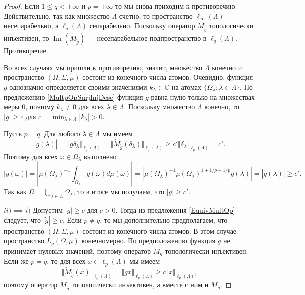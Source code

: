 \begin{proof}
Если $1\leq q<+\infty$ и $p=+\infty$ то мы снова приходим к противоречию. Действительно, так как множество $\Lambda$ счетно, то пространство $\ell_\infty(\Lambda)$ несепарабельно, а $\ell_q(\Lambda)$ сепарабельно. Поскольку оператор $\widetilde{M}_{\widetilde{g}}$ топологически инъективен, то $\operatorname{Im}(\widetilde{M}_{\widetilde{g}})$ --- несепарабельное подпространство в $\ell_q(\Lambda)$. Противоречие.

Во всех случаях мы пришли к противоречию, значит, множество $\Lambda$ конечно и пространство $(\Omega,\Sigma,\mu)$ состоит из конечного числа атомов. Очевидно, функция
$g$ однозначно определяется своими значениями $k_\lambda\in\mathbb{C}$ на атомах $\{\Omega_\lambda:\lambda\in\Lambda\}$. По предложению \ref{MultpOpSurjInjDesc} функция $g$ равна нулю только на множествах меры $0$, поэтому $k_\lambda\neq 0$ для всех $\lambda\in\Lambda$. Поскольку множество $\Lambda$ конечно, то $|g|\geq c$ для $c=\min_{\lambda\in\Lambda}|k_\lambda|>0$. 

Пусть $p=q$. Для любого $\lambda\in\Lambda$ мы имеем
$$
|\widetilde{g}(\lambda)|
=\Vert \widetilde{g} \delta_\lambda\Vert_{\ell_q(\Lambda)}
=\Vert \widetilde{M}_{\widetilde{g}}(\delta_\lambda)\Vert_{\ell_q(\Lambda)}
\geq c'\Vert \delta_\lambda\Vert_{\ell_p(\Lambda)}
=c'.
$$
Поэтому для всех $\omega\in\Omega_\lambda$ выполнено
$$
|g(\omega)|
=\left|\mu(\Omega_\lambda)^{-1}\int_{\Omega_\lambda}g(\omega)d\mu(\omega)\right|
=\left|\mu(\Omega_\lambda)^{-1}\mu(\Omega_\lambda)^{1+1/p-1/p}\widetilde{g}(\lambda)\right|
=|\widetilde{g}(\lambda)|\geq c'.
$$
Так как $\Omega=\bigcup_{\lambda\in\Lambda}\Omega_\lambda$, то в итоге мы получаем, что $|g|\geq c'$.

$ii)$$\implies$$ i)$ Допустим $|g|\geq c$ для $c>0$. Тогда из предложения \ref{EquivMultOp} следует, что $|\widetilde{g}|\geq c$. Если $p\neq q$, то мы дополнительно предполагаем, что пространство $(\Omega,\Sigma,\mu)$ состоит из конечного числа атомов. В этом случае пространство $L_p(\Omega,\mu)$ конечномерно. По предположению функция $g$ не принимает нулевых значений, поэтому оператор $M_g$ топологически инъективен. Если же $p=q$, то для всех $x\in\ell_p(\Lambda)$ мы имеем
$$
\Vert \widetilde{M}_{\widetilde{g}}(x)\Vert_{\ell_p(\Lambda)}=\Vert g x\Vert_{\ell_p(\Lambda)}\geq c\Vert x\Vert_{\ell_p(\Lambda)},
$$
поэтому оператор $\widetilde{M}_{\widetilde{g}}$ топологически инъективен, а вместе с ним и $M_g$.
\end{proof}

